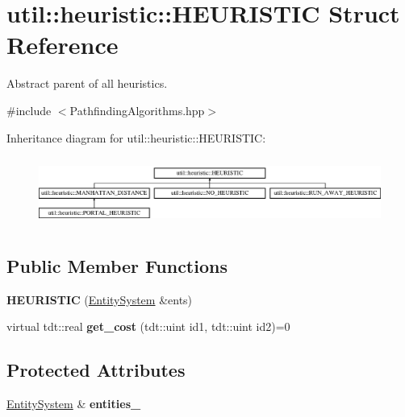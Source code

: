 \hypertarget{structutil_1_1heuristic_1_1_h_e_u_r_i_s_t_i_c}{}\section{util\+:\+:heuristic\+:\+:H\+E\+U\+R\+I\+S\+T\+IC Struct Reference}
\label{structutil_1_1heuristic_1_1_h_e_u_r_i_s_t_i_c}


Abstract parent of all heuristics.  




{\ttfamily \#include $<$Pathfinding\+Algorithms.\+hpp$>$}

Inheritance diagram for util\+:\+:heuristic\+:\+:H\+E\+U\+R\+I\+S\+T\+IC\+:\begin{figure}[H]
\begin{center}
\leavevmode
\includegraphics[height=2.295082cm]{structutil_1_1heuristic_1_1_h_e_u_r_i_s_t_i_c}
\end{center}
\end{figure}
\subsection*{Public Member Functions}
\begin{DoxyCompactItemize}
\item 
{\bfseries H\+E\+U\+R\+I\+S\+T\+IC} (\hyperlink{class_entity_system}{Entity\+System} \&ents)\hypertarget{structutil_1_1heuristic_1_1_h_e_u_r_i_s_t_i_c_a6ce8869fa7601d51172e537fd552356f}{}\label{structutil_1_1heuristic_1_1_h_e_u_r_i_s_t_i_c_a6ce8869fa7601d51172e537fd552356f}

\item 
virtual tdt\+::real {\bfseries get\+\_\+cost} (tdt\+::uint id1, tdt\+::uint id2)=0\hypertarget{structutil_1_1heuristic_1_1_h_e_u_r_i_s_t_i_c_a846e258ef0135548dcc0fdab0f6a1b79}{}\label{structutil_1_1heuristic_1_1_h_e_u_r_i_s_t_i_c_a846e258ef0135548dcc0fdab0f6a1b79}

\end{DoxyCompactItemize}
\subsection*{Protected Attributes}
\begin{DoxyCompactItemize}
\item 
\hyperlink{class_entity_system}{Entity\+System} \& {\bfseries entities\+\_\+}\hypertarget{structutil_1_1heuristic_1_1_h_e_u_r_i_s_t_i_c_aeb53f19deca6db9b8c64aca7385a2247}{}\label{structutil_1_1heuristic_1_1_h_e_u_r_i_s_t_i_c_aeb53f19deca6db9b8c64aca7385a2247}

\end{DoxyCompactItemize}


